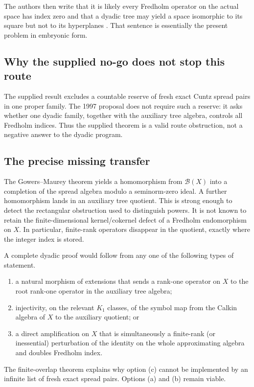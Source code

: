 \documentclass[11pt]{article}
\theoremstyle{definition}
\theoremstyle{remark}
\newcommand{\B}{\mathcal B}
\begin{document}
The authors then write that it is likely every Fredholm operator on the actual
space has index zero and that a dyadic tree may yield a space isomorphic to its
square but not to its hyperplanes \cite[Section 4.4]{GowersMaurey1997}.
That sentence is essentially the present problem in embryonic form.

\subsection{Why the supplied no-go does not stop this route}

The supplied result excludes a countable reserve of fresh exact Cuntz spread
pairs in one proper family.  The 1997 proposal does not require such a reserve:
it asks whether one dyadic family, together with the auxiliary tree algebra,
controls all Fredholm indices.  Thus the supplied theorem is a valid route
obstruction, not a negative answer to the dyadic program.

\subsection{The precise missing transfer}

The Gowers--Maurey theorem yields a homomorphism from $\B(X)$ into a completion
of the spread algebra modulo a seminorm-zero ideal.  A further homomorphism
lands in an auxiliary tree quotient.  This is strong enough to detect the
rectangular obstruction used to distinguish powers.  It is not known to retain
the finite-dimensional kernel/cokernel defect of a Fredholm endomorphism on
$X$.  In particular, finite-rank operators disappear in the quotient, exactly
where the integer index is stored.

A complete dyadic proof would follow from any one of the following types of
statement.
\begin{enumerate}[label=\textup{(\alph*)},leftmargin=2em]
\item a natural morphism of extensions that sends a rank-one operator on $X$ to
the root rank-one operator in the auxiliary tree algebra;
\item injectivity, on the relevant $K_1$ classes, of the symbol map from the
Calkin algebra of $X$ to the auxiliary quotient; or
\item a direct amplification on $X$ that is simultaneously a finite-rank (or
inessential) perturbation of the identity on the whole approximating algebra
and doubles Fredholm index.
\end{enumerate}
The finite-overlap theorem explains why option (c) cannot be implemented by an
infinite list of fresh exact spread pairs.  Options (a) and (b) remain viable.
\end{document}
